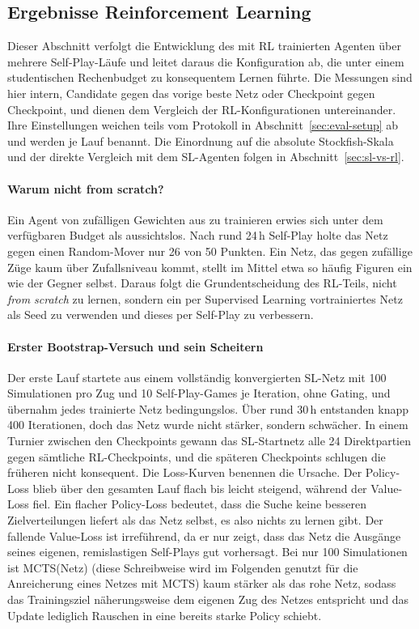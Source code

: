\documentclass[
  a4paper, 12pt,
  parskip=half,
  headings=small,
  bibliography=totoc
]{scrartcl}
\begin{document}
\subsection{Ergebnisse Reinforcement Learning}
\label{sec:rl-results}%
Dieser Abschnitt verfolgt die Entwicklung des mit RL trainierten Agenten über mehrere Self-Play-Läufe und leitet daraus die Konfiguration ab, die unter einem studentischen Rechenbudget zu konsequentem Lernen führte. 
Die Messungen sind hier intern, Candidate gegen das vorige beste Netz oder Checkpoint gegen Checkpoint, und dienen dem Vergleich der RL-Konfigurationen untereinander. Ihre Einstellungen weichen teils vom Protokoll in Abschnitt~\ref{sec:eval-setup} ab und werden je Lauf benannt. Die Einordnung auf die absolute Stockfish-Skala und der direkte Vergleich mit dem SL-Agenten folgen in Abschnitt~\ref{sec:sl-vs-rl}.
\paragraph{Warum nicht from scratch?}
Ein Agent von zufälligen Gewichten aus zu trainieren erwies sich unter dem verfügbaren Budget als aussichtslos. Nach rund 24\,h Self-Play holte das Netz gegen einen Random-Mover nur 26 von 50 Punkten. Ein Netz, das gegen zufällige Züge kaum über Zufallsniveau kommt, stellt im Mittel etwa so häufig Figuren ein wie der Gegner selbst. 
Daraus folgt die Grundentscheidung des RL-Teils, nicht \emph{from scratch} zu lernen, sondern ein per Supervised Learning vortrainiertes Netz als Seed zu verwenden und dieses per Self-Play zu verbessern.

\paragraph{Erster Bootstrap-Versuch und sein Scheitern}
Der erste Lauf startete aus einem vollständig konvergierten SL-Netz mit 100 Simulationen pro Zug und 10 Self-Play-Games je Iteration, ohne Gating, und übernahm jedes trainierte Netz bedingungslos. Über rund 30\,h entstanden knapp 400 Iterationen, doch das Netz wurde nicht stärker, sondern schwächer. In einem Turnier zwischen den Checkpoints gewann das SL-Startnetz alle 24 Direktpartien gegen sämtliche RL-Checkpoints, und die späteren Checkpoints schlugen die früheren nicht konsequent. Die Loss-Kurven benennen die Ursache. Der Policy-Loss blieb über den gesamten Lauf flach bis leicht steigend, während der Value-Loss fiel. 
Ein flacher Policy-Loss bedeutet, dass die Suche keine besseren Zielverteilungen liefert als das Netz selbst, es also nichts zu lernen gibt. 
Der fallende Value-Loss ist irreführend, da er nur zeigt, dass das Netz die Ausgänge seines eigenen, remislastigen Self-Plays gut vorhersagt. Bei nur 100 Simulationen ist MCTS(Netz) (diese Schreibweise wird im Folgenden genutzt für die Anreicherung eines Netzes mit MCTS) kaum stärker als das rohe Netz, sodass das Trainingsziel näherungsweise dem eigenen Zug des Netzes entspricht und das Update lediglich Rauschen in eine bereits starke Policy schiebt.
\end{document}
